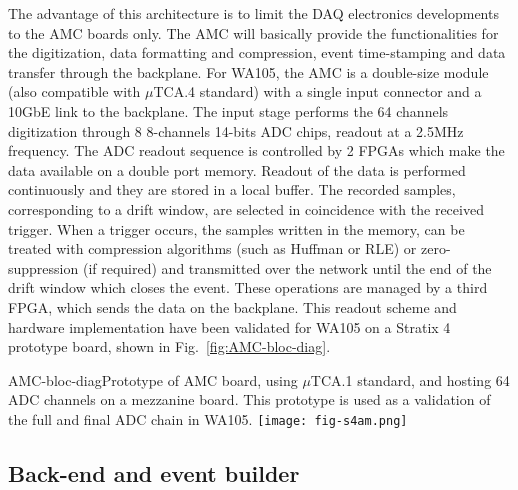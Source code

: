 The advantage of this architecture is to limit the DAQ electronics
developments to the AMC boards only. The AMC will basically provide
the functionalities for the digitization, data formatting and
compression, event time-stamping and data transfer through the
backplane. For WA105, the AMC is a double-size module (also compatible
with $\mu$TCA.4 standard) with a single input connector and a 10GbE
link to the backplane. The input stage performs the 64 channels
digitization through 8 8-channels 14-bits ADC chips, readout at a
2.5MHz frequency. The ADC readout sequence is controlled by 2 FPGAs
which make the data available on a double port memory. Readout of the
data is performed continuously and they are stored in a local
buffer. The recorded samples, corresponding to a drift window, are
selected in coincidence with the received trigger. When a trigger
occurs, the samples written in the memory, can be treated with
compression algorithms (such as Huffman or RLE) or zero-suppression
(if required) and transmitted over the network until the end of the
drift window which closes the event. These operations are managed by a
third FPGA, which sends the data on the backplane.  This readout
scheme and hardware implementation have been validated for WA105 on a
Stratix 4 prototype board, shown in Fig.~\ref{fig:AMC-bloc-diag}.
\begin{cdrfigure}{AMC-bloc-diag}{\small Prototype of AMC board, using $\mu$TCA.1 standard, and hosting 64 ADC channels on a mezzanine board. This prototype is used as a validation of the full and final ADC chain in WA105.}
\texttt{[image: fig-s4am.png]}
\end{cdrfigure}

\subsection{Back-end and event builder}



